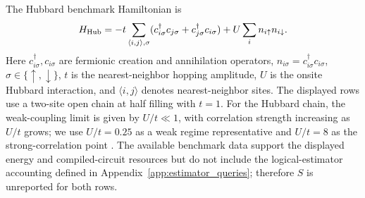 \documentclass[
  reprint,
  amsmath,
  amssymb,
  aps,
  pra,
  nofootinbib,
  superscriptaddress,
  floatfix
]{revtex4-2}
\begin{document}
The Hubbard benchmark Hamiltonian is
\begin{equation*}
H_{\rm Hub}
=-t\sum_{\langle i,j\rangle,\sigma}
(c_{i\sigma}^{\dagger}c_{j\sigma}+c_{j\sigma}^{\dagger}c_{i\sigma})
+U\sum_i n_{i\uparrow}n_{i\downarrow}.
\end{equation*}
Here \(c_{i\sigma}^{\dagger},c_{i\sigma}\) are fermionic creation and
annihilation operators, \(n_{i\sigma}=c_{i\sigma}^{\dagger}c_{i\sigma}\),
\(\sigma\in\{\uparrow,\downarrow\}\), \(t\) is the nearest-neighbor hopping
amplitude, \(U\) is the onsite Hubbard interaction, and
\(\langle i,j\rangle\) denotes nearest-neighbor sites.
The displayed rows use a two-site open chain at half filling with \(t=1\).
For the Hubbard chain, the weak-coupling limit is given by
\(U/t\ll 1\), with correlation strength increasing as \(U/t\) grows;
we use \(U/t=0.25\) as a weak regime representative and \(U/t=8\) as the
strong-correlation point \cite{Arovas2022Hubbard}.
The available benchmark data support the displayed energy and compiled-circuit
resources but do not include the logical-estimator accounting defined in
Appendix~\ref{app:estimator_queries}; therefore \(S\) is
unreported for both rows.
\end{document}
